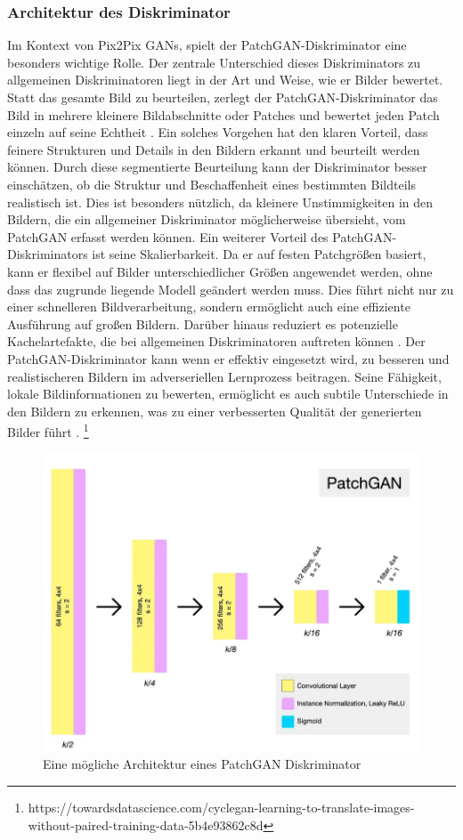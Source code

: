 \subsubsection{Architektur des Diskriminator}
\label{sec:PatchGAN}
Im Kontext von Pix2Pix GANs, spielt der PatchGAN-Diskriminator eine besonders wichtige Rolle. Der zentrale Unterschied dieses Diskriminators zu allgemeinen Diskriminatoren liegt in der Art und Weise, wie er Bilder bewertet. Statt das gesamte Bild zu beurteilen, zerlegt der PatchGAN-Diskriminator das Bild in mehrere kleinere Bildabschnitte oder Patches und bewertet jeden Patch einzeln auf seine Echtheit \cite{PhillipIsola.}. \newline
Ein solches Vorgehen hat den klaren Vorteil, dass feinere Strukturen und Details in den Bildern erkannt und beurteilt werden können. Durch diese segmentierte Beurteilung kann der Diskriminator besser einschätzen, ob die Struktur und Beschaffenheit eines bestimmten Bildteils realistisch ist. Dies ist besonders nützlich, da kleinere Unstimmigkeiten in den Bildern, die ein allgemeiner Diskriminator möglicherweise übersieht, vom PatchGAN erfasst werden können. \newline
Ein weiterer Vorteil des PatchGAN-Diskriminators ist seine Skalierbarkeit. Da er auf festen Patchgrößen basiert, kann er flexibel auf Bilder unterschiedlicher Größen angewendet werden, ohne dass das zugrunde liegende Modell geändert werden muss. Dies führt nicht nur zu einer schnelleren Bildverarbeitung, sondern ermöglicht auch eine effiziente Ausführung auf großen Bildern. Darüber hinaus reduziert es potenzielle Kachelartefakte, die bei allgemeinen Diskriminatoren auftreten können \cite{PhillipIsola.}.\newline
Der PatchGAN-Diskriminator kann wenn er effektiv eingesetzt wird, zu besseren und realistischeren Bildern im adverseriellen Lernprozess beitragen. Seine Fähigkeit, lokale Bildinformationen zu bewerten, ermöglicht es auch subtile Unterschiede in den Bildern zu erkennen, was zu einer verbesserten Qualität der generierten Bilder führt \cite{PhillipIsola.}.
\footnote[1]{https://towardsdatascience.com/cyclegan-learning-to-translate-images-without-paired-training-data-5b4e93862c8d}

\begin{figure}[h]
	\centering
	\includegraphics[width=0.7\linewidth]{./images/cycleGanDiscriminatorArchitecutre.png}
	\caption{Eine mögliche Architektur eines PatchGAN Diskriminator\protect\footnotemark[1]}
	\label{fig:PatchGANDiskriminator}
\end{figure}
\newpage

